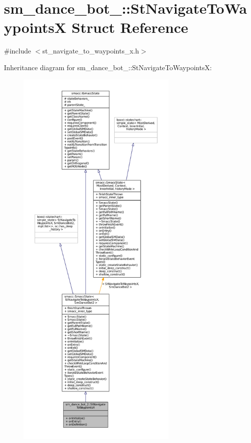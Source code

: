\hypertarget{structsm__dance__bot__2_1_1StNavigateToWaypointsX}{}\section{sm\+\_\+dance\+\_\+bot\+\_\+:\+:St\+Navigate\+To\+WaypointsX Struct Reference}
\label{structsm__dance__bot__2_1_1StNavigateToWaypointsX}


{\ttfamily \#include $<$st\+\_\+navigate\+\_\+to\+\_\+waypoints\+\_\+x.\+h$>$}



Inheritance diagram for sm\+\_\+dance\+\_\+bot\+\_\+:\+:St\+Navigate\+To\+WaypointsX\+:
\nopagebreak
\begin{figure}[H]
\begin{center}
\leavevmode
\includegraphics[height=550pt]{structsm__dance__bot__2_1_1StNavigateToWaypointsX__inherit__graph}
\end{center}
\end{figure}


